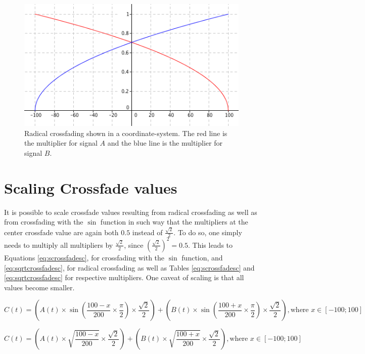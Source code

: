\documentclass[12pt,twoside]{report}
\begin{document}
\begin{figure}[h!]

  \includegraphics[scale=0.7]{img/sqrtcrossfade}

  \caption{Radical crossfading shown in a coordinate-system. The red line is the multiplier for signal $A$ and the blue line is the multiplier for signal $B$.}

  \label{fig:sqrtcrossfade}

\end{figure}

\pagebreak

\section{Scaling Crossfade values}

It is possible to scale crossfade values resulting from radical crossfading as well as from crossfading with the $\sin$ function in such way that the multipliers at the center crossfade value are again both $0.5$ instead of $\frac{\sqrt{2}}{2}$. To do so, one simply needs to multiply all multipliers by $\frac{\sqrt{2}}{2}$, since $(\frac{\sqrt{2}}{2})^2 = 0.5$. This leads to Equations \ref{eq:scrossfadesc}, for crossfading with the $\sin$ function, and \ref{eq:sqrtcrossfadesc}, for radical crossfading as well as Tables \ref{eq:scrossfadesc} and \ref{eq:sqrtcrossfadesc} for respective multipliers. One caveat of scaling is that all values become smaller.

\begin{equation}
  C(t) = (A(t) \times \sin(\frac{100 - x}{200} \times \frac{\pi}{2}) \times \frac{\sqrt{2}}{2}) + (B(t) \times \sin(\frac{100 + x}{200} \times \frac{\pi}{2}) \times \frac{\sqrt{2}}{2}), \text{where } x \in [-100;100]
  \label{eq:scrossfadesc}
\end{equation}

\begin{equation}
  C(t) = (A(t) \times \sqrt{\frac{100 - x}{200}} \times \frac{\sqrt{2}}{2}) + (B(t) \times \sqrt{\frac{100 + x}{200}} \times \frac{\sqrt{2}}{2}), \text{where } x \in [-100;100]
  \label{eq:sqrtcrossfadesc}
\end{equation}
\end{document}
